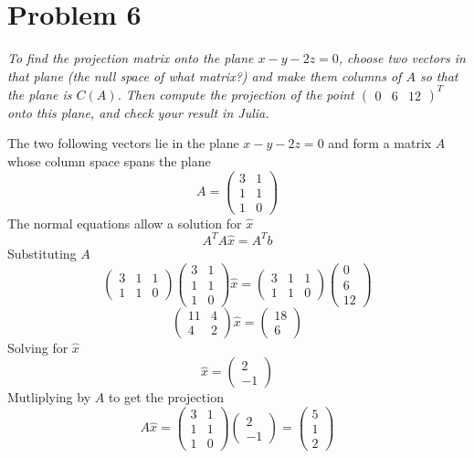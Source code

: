 \documentclass{article}
\begin{document}
\section*{Problem 6}

\textit{To find the projection matrix onto the plane $x - y - 2z = 0$, choose
two vectors in that plane (the null space of what matrix?) and make them
columns of $A$ so that the plane is $C(A)$. Then compute the projection of
the point $\begin{pmatrix} 0 & 6 & 12 \end{pmatrix}^T$ onto this plane, and
check your result in Julia.}

\bigbreak

The two following vectors lie in the plane $x - y - 2z = 0$ and form a matrix
$A$ whose column space spans the plane
$$ A = \begin{pmatrix}
    3 & 1 \\
    1 & 1 \\
    1 & 0
\end{pmatrix} $$
The normal equations allow a solution for $\hat{x}$
$$ A^T A \hat{x} = A^T b $$
Substituting $A$
$$ \begin{pmatrix}
    3 & 1 & 1 \\
    1 & 1 & 0
\end{pmatrix} \begin{pmatrix}
    3 & 1 \\
    1 & 1 \\
    1 & 0
\end{pmatrix} \hat{x} = \begin{pmatrix}
    3 & 1 & 1 \\
    1 & 1 & 0
\end{pmatrix} \begin{pmatrix}
    0 \\
    6 \\
    12
\end{pmatrix} $$
$$ \begin{pmatrix}
    11 & 4 \\
    4 & 2
\end{pmatrix} \hat{x} = \begin{pmatrix}
    18 \\
    6
\end{pmatrix} $$
Solving for $\hat{x}$
$$ \hat{x} = \begin{pmatrix}
    2 \\
    -1
\end{pmatrix} $$
Mutliplying by $A$ to get the projection
$$ A\hat{x} = \begin{pmatrix}
    3 & 1 \\
    1 & 1 \\
    1 & 0
\end{pmatrix} \begin{pmatrix}
    2 \\
    -1
\end{pmatrix} = \begin{pmatrix}
    5 \\
    1 \\
    2
\end{pmatrix} $$ 
\end{document}
